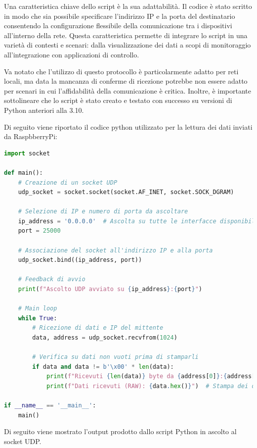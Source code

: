 \documentclass[titlepage]{report}
\begin{document}
	Una caratteristica chiave dello script è la sua adattabilità. Il codice è stato scritto in modo che sia possibile specificare l'indirizzo IP e la porta del destinatario consentendo la configurazione flessibile della comunicazione tra i dispositivi all'interno della rete. Questa caratteristica permette di integrare lo script in una varietà di contesti e scenari: dalla visualizzazione dei dati a scopi di monitoraggio all'integrazione con applicazioni di controllo.

	Va notato che l'utilizzo di questo protocollo è particolarmente adatto per reti locali, ma data la mancanza di conferme di ricezione potrebbe non essere adatto per scenari in cui l'affidabilità della comunicazione è critica. Inoltre, è importante sottolineare che lo script è stato creato e testato con successo su versioni di Python anteriori alla 3.10. \par

	Di seguito viene riportato il codice python utilizzato per la lettura dei dati inviati da RaspbberryPi:

	\begin{lstlisting}[label={lst:udp_listener.py},caption={Script \texttt{udp\_listener.py} per l'ascolto della porta UDP utilizzata dal RaspberryPi}, language=python]
import socket

def main():
	# Creazione di un socket UDP
	udp_socket = socket.socket(socket.AF_INET, socket.SOCK_DGRAM)

	# Selezione di IP e numero di porta da ascoltare
	ip_address = '0.0.0.0'  # Ascolta su tutte le interfacce disponibili
	port = 25000

	# Associazione del socket all'indirizzo IP e alla porta
	udp_socket.bind((ip_address, port))

	# Feedback di avvio
	print(f"Ascolto UDP avviato su {ip_address}:{port}")

	# Main loop
	while True:
		# Ricezione di dati e IP del mittente
		data, address = udp_socket.recvfrom(1024)

		# Verifica su dati non vuoti prima di stamparli
		if data and data != b'\x00' * len(data):
			print(f"Ricevuti {len(data)} byte da {address[0]}:{address[1]}")
			print(f"Dati ricevuti (RAW): {data.hex()}")  # Stampa dei dati in formato esadecimale (hex)

if __name__ == '__main__':
    main()
	\end{lstlisting}

	Di seguito viene mostrato l'output prodotto dallo script Python in ascolto al socket UDP.
\end{document}
